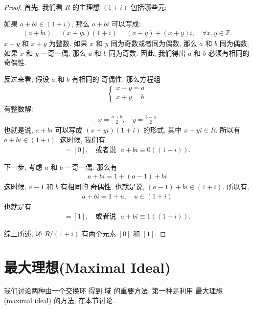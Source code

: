 \documentclass[utf8]{ctexbook}
\theoremstyle{definition}
\begin{document}
\begin{proof}
首先, 我们看 $R$ 的主理想 $(1+i)$ 包括哪些元:

如果 $a+bi \in (1+i)$, 那么 $a+bi$ 可以写成: 
\begin{align*}
(a+bi) = (x + yi)(1+i) = (x-y) + (x+y)i , \quad \forall x, y \in \mathbb{Z} .
\end{align*}
$x-y$ 和 $x+y$ 为整数. 如果 $x$ 和 $y$ 同为奇数或者同为偶数, 那么 $a$ 和 $b$ 同为偶数; 如果 $x$ 和 $y$ 一奇一偶, 那么  $a$ 和 $b$ 同为奇数. 因此, 我们得出 $a$ 和 $b$ 必须有相同的 奇偶性.

反过来看, 假设 $a$ 和 $b$ 有相同的 奇偶性. 那么方程组
\begin{align*}
\left\{ 
\begin{array}{l}
x-y = a \\
x + y = b
\end{array}
\right.
\end{align*}
有整数解:
\begin{align*}
x = \frac{a+b}{2}, \quad y = \frac{b-a}{2}
\end{align*}
也就是说, $a+bi$ 可以写成 $(x + yi)(1+i)$ 的形式, 其中 $x+yi \in R$. 所以有 $a+bi \in (1+i)$. 这时候, 我们有
\begin{align*}
[a+bi] = [0] , \quad \mbox{或者说 } \, \, a + bi \equiv 0 ( (1+i) ) .
\end{align*}

下一步, 考虑 $a$ 和 $b$ 一奇一偶. 那么有
\begin{align*}
a + bi = 1 + (a-1) + bi 
\end{align*}
这时候, $a-1$ 和 $b$ 有相同的 奇偶性. 也就是说, $(a-1) + bi \in (1+i) $. 所以有,
\begin{align*}
a + b i = 1 + u, \quad u \in (1+i)
\end{align*}
也就是有
\begin{align*}
[a+bi] = [1] , \quad \mbox{或者说 } \, \, a + bi \equiv 1 ( (1+i) ) .
\end{align*}

综上所述, 环 $R/(1+i)$ 有两个元素 $[0]$ 和 $[1]$.

\end{proof}


\section{最大理想(Maximal Ideal)}

我们讨论两种由一个交换环 得到 域 的重要方法. 第一种是利用 最大理想 (maximal ideal) 的方法, 在本节讨论.
\end{document}
